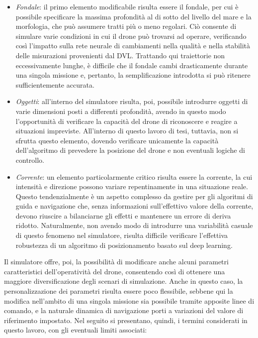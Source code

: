     \begin{itemize}

        \item \textit{Fondale}: il primo elemento modificabile risulta essere il fondale, per cui è possibile specificare la massima profondità al di sotto del livello del mare e la morfologia, che può assumere tratti più o meno regolari. Ciò consente di simulare varie condizioni in cui il drone può trovarsi ad operare, verificando così l'impatto sulla rete neurale di cambiamenti nella qualità e nella stabilità delle misurazioni provenienti dal DVL. Trattando qui traiettorie non eccessivamente lunghe, è difficile che il fondale cambi drasticamente durante una singola missione e, pertanto, la semplificazione introdotta si può ritenere sufficientemente accurata.
        
        \item \textit{Oggetti}: all'interno del simulatore risulta, poi, possibile introdurre oggetti di varie dimensioni posti a differenti profondità, avendo in questo modo l'opportunità di verificare la capacità del drone di riconoscere e reagire a situazioni impreviste. All'interno di questo lavoro di tesi, tuttavia, non si sfrutta questo elemento, dovendo verificare unicamente la capacità dell'algoritmo di prevedere la posizione del drone e non eventuali logiche di controllo.  
        
        \item \textit{Corrente}: un elemento particolarmente critico risulta essere la corrente, la cui intensità e direzione possono variare repentinamente in una situazione reale. Questo tendenzialmente è un aspetto complesso da gestire per gli algoritmi di guida e navigazione che, senza informazioni sull'effettivo valore della corrente, devono riuscire a bilanciarne gli effetti e mantenere un errore di deriva ridotto. Naturalmente, non avendo modo di introdurre una variabilità casuale di questo fenomeno nel simulatore, risulta difficile verificare l'effettiva robustezza di un algoritmo di posizionamento basato sul deep learning. 
        
    \end{itemize}

Il simulatore offre, poi, la possibilità di modificare anche alcuni parametri caratteristici dell'operatività del drone, consentendo così di ottenere una maggiore diversificazione degli scenari di simulazione. Anche in questo caso, la personalizzazione dei parametri risulta essere poco flessibile, sebbene qui la modifica nell'ambito di una singola missione sia possibile tramite apposite linee di comando, e la naturale dinamica di navigazione porti a variazioni del valore di riferimento impostato. Nel seguito si presentano, quindi, i termini considerati in questo lavoro, con gli eventuali limiti associati:

